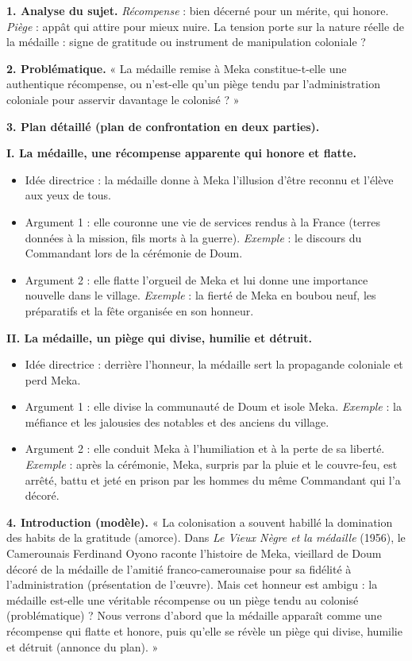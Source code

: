 \documentclass[11pt]{article}
\begin{document}
\begin{corrige}
\textbf{1. Analyse du sujet.} \emph{Récompense} : bien décerné pour un mérite, qui honore. \emph{Piège} : appât qui attire pour mieux nuire. La tension porte sur la nature réelle de la médaille : signe de gratitude ou instrument de manipulation coloniale ?

\textbf{2. Problématique.} « La médaille remise à Meka constitue-t-elle une authentique récompense, ou n'est-elle qu'un piège tendu par l'administration coloniale pour asservir davantage le colonisé ? »

\textbf{3. Plan détaillé (plan de confrontation en deux parties).}

\textbf{I. La médaille, une récompense apparente qui honore et flatte.}
\begin{itemize}
\item Idée directrice : la médaille donne à Meka l'illusion d'être reconnu et l'élève aux yeux de tous.
\item Argument 1 : elle couronne une vie de services rendus à la France (terres données à la mission, fils morts à la guerre). \emph{Exemple} : le discours du Commandant lors de la cérémonie de Doum.
\item Argument 2 : elle flatte l'orgueil de Meka et lui donne une importance nouvelle dans le village. \emph{Exemple} : la fierté de Meka en boubou neuf, les préparatifs et la fête organisée en son honneur.
\end{itemize}

\textbf{II. La médaille, un piège qui divise, humilie et détruit.}
\begin{itemize}
\item Idée directrice : derrière l'honneur, la médaille sert la propagande coloniale et perd Meka.
\item Argument 1 : elle divise la communauté de Doum et isole Meka. \emph{Exemple} : la méfiance et les jalousies des notables et des anciens du village.
\item Argument 2 : elle conduit Meka à l'humiliation et à la perte de sa liberté. \emph{Exemple} : après la cérémonie, Meka, surpris par la pluie et le couvre-feu, est arrêté, battu et jeté en prison par les hommes du même Commandant qui l'a décoré.
\end{itemize}

\textbf{4. Introduction (modèle).} « La colonisation a souvent habillé la domination des habits de la gratitude (amorce). Dans \emph{Le Vieux Nègre et la médaille} (1956), le Camerounais Ferdinand Oyono raconte l'histoire de Meka, vieillard de Doum décoré de la médaille de l'amitié franco-camerounaise pour sa fidélité à l'administration (présentation de l'œuvre). Mais cet honneur est ambigu : la médaille est-elle une véritable récompense ou un piège tendu au colonisé (problématique) ? Nous verrons d'abord que la médaille apparaît comme une récompense qui flatte et honore, puis qu'elle se révèle un piège qui divise, humilie et détruit (annonce du plan). »


\end{corrige}
\end{document}
